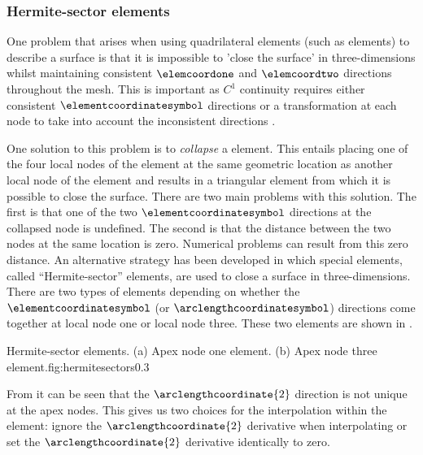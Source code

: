 \subsubsection{Hermite-sector elements}
\label{sec:hselements}

One problem that arises when using quadrilateral elements (such as
\bicubicherm elements) to describe a surface is that it is impossible to
'close the surface' in three-dimensions whilst maintaining consistent $\elemcoordone$
and $\elemcoordtwo$ directions throughout the mesh. This is important as $C^{1}$
continuity requires either consistent $\elementcoordinatesymbol$ directions or a transformation at
each node to take into account the inconsistent directions \citep{petera:1994}.

One solution to this problem is to \emph{collapse} a \bicubicherm element.
This entails placing one of the four local nodes of the element at the same
geometric location as another local node of the element and results in a
triangular element from which it is possible to close the surface. There are
two main problems with this solution.  The first is that one of the two $\elementcoordinatesymbol$
directions at the collapsed node is undefined.  The second is that the
distance between the two nodes at the same location is zero.  Numerical
problems can result from this zero distance.  An alternative strategy has
been developed in which special elements, called ``Hermite-sector''
elements, are used to close a \bicubicherm
surface in three-dimensions. There are two types of elements depending on
whether the $\elementcoordinatesymbol$ (or $\arclengthcoordinatesymbol$) directions come together at local node one or local
node three.  These two elements are shown in .

{Hermite-sector elements. (a) Apex node one element. (b) Apex node three
  element.}{fig:hermitesectors}{0.3}

From  it can be seen that the $\arclengthcoordinate{2}$ direction is
not unique at the apex nodes. This gives us two choices for the interpolation
within the element: ignore the $\arclengthcoordinate{2}$ derivative when interpolating or set
the $\arclengthcoordinate{2}$ derivative identically to zero.

